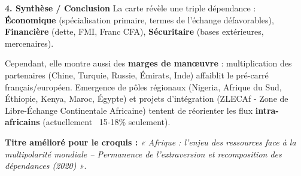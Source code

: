 \documentclass[11pt]{article}
\newcommand{\cle}[1]{{\popxbold\color{popdark}#1}}
\begin{document}
\begin{exoresolu}
\textbf{4. Synthèse / Conclusion}
La carte révèle une \cle{triple dépendance} : \textbf{Économique} (spécialisation primaire, termes de l'échange défavorables), \textbf{Financière} (dette, FMI, Franc CFA), \textbf{Sécuritaire} (bases extérieures, mercenaires).
\par Cependant, elle montre aussi des \textbf{marges de manœuvre} : multiplication des partenaires (Chine, Turquie, Russie, Émirats, Inde) affaiblit le \cle{pré-carré} français/européen. Emergence de \cle{pôles régionaux} (Nigeria, Afrique du Sud, Éthiopie, Kenya, Maroc, Égypte) et projets d'intégration (\cle{ZLECAf} - Zone de Libre-Échange Continentale Africaine) tentent de réorienter les flux \textbf{intra-africains} (actuellement ~15-18\% seulement).

\par \textbf{Titre amélioré pour le croquis :} \emph{« Afrique : l'enjeu des ressources face à la multipolarité mondiale – Permanence de l'extraversion et recomposition des dépendances (2020) »}.
\end{exoresolu}
\end{document}
